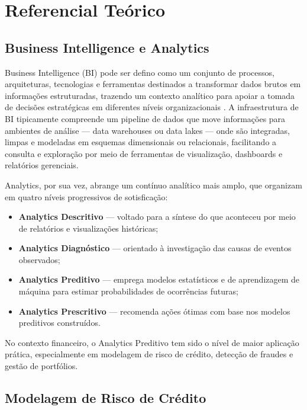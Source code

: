 \chapter{Referencial Teórico} \label{chap:referencial}

\section{Business Intelligence e Analytics}

Business Intelligence (BI) pode ser defino como um conjunto de processos, arquiteturas, tecnologias e ferramentas destinados a transformar dados brutos em informações estruturadas, trazendo um contexto analítico para apoiar a tomada de decisões estratégicas em diferentes níveis organizacionais \cite{kimball&ross2013}. A infraestrutura de BI tipicamente compreende um pipeline de dados que move informações para ambientes de análise — data warehouses ou data lakes — onde são integradas, limpas e modeladas em esquemas dimensionais ou relacionais, facilitando a consulta e exploração por meio de ferramentas de visualização, dashboards e relatórios gerenciais.

Analytics, por sua vez, abrange um contínuo analítico mais amplo, que \cite{davenport&jeanne2007} organizam em quatro níveis progressivos de sotisficação:
\begin{itemize}
    \item[(i)] \textbf{Analytics Descritivo} — voltado para a síntese do que aconteceu por meio de relatórios e visualizações históricas;
    \item[(ii)] \textbf{Analytics Diagnóstico} — orientado à investigação das causas de eventos observados;
    \item[(iii)] \textbf{Analytics Preditivo} — emprega modelos estatísticos e de aprendizagem de máquina para estimar probabilidades de ocorrências futuras;
    \item[(iv)] \textbf{Analytics Prescritivo} — recomenda ações ótimas com base nos modelos preditivos construídos.
\end{itemize}
No contexto financeiro, o Analytics Preditivo tem sido o nível de maior aplicação prática, especialmente em modelagem de risco de crédito, detecção de fraudes e gestão de portfólios.

\section{Modelagem de Risco de Crédito}

